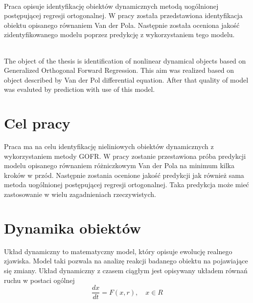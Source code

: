 



\renewcommand{\tablename}{Tabela}

\pagestyle{empty}
\stronatytulowa

\newpage
\setcounter{page}{1}

\newpage
\textbf{\tytulpl} \vspace*{0.2cm} \\
Praca opisuje identyfikację obiektów dynamicznych metodą uogólnionej postępującej regresji ortogonalnej. W pracy została przedstawiona identyfikacja obiektu opisanego równaniem Van der Pola. Następnie została oceniona jakość zidentyfikowanego modelu poprzez predykcję z wykorzystaniem tego modelu.

\vspace*{2cm}
\textbf{\tytulen} \vspace*{0.2cm} \\
The object of the thesis is identification of nonlinear dynamical objects based on Generalized Orthogonal Forward Regression. This aim was realized based on object described by Van der Pol differential equation. After that quality of model was evaluted by prediction with use of this model. 

\newpage
\tableofcontents

\newpage
\pagestyle{plain}

\section{Cel pracy}
Praca ma na celu identyfikację nieliniowych obiektów dynamicznych z wykorzystaniem metody GOFR. W pracy zostanie przestawiona próba predykcji modelu opisanego równaniem różniczkowym Van der Pola na minimum kilka kroków w przód. Następnie zostania ocenione jakość predykcji jak również sama metoda uogólnionej postępującej regresji ortogonalnej.  Taka predykcja może mieć zastosowanie w wielu zagadnieniach rzeczywistych. 

\newpage
\section{Dynamika obiektów}
Układ dynamiczny to matematyczny model, który opisuje ewolucję realnego zjawiska. Model taki pozwala na analizę reakcji badanego obiektu na pojawiające się zmiany.
Układ dynamiczny z czasem ciągłym jest opisywany układem równań ruchu w postaci ogólnej\cite{Kosinski}
\begin{equation}
	\frac{dx}{dt} = F(x,r), \quad x \in R
\end{equation}

